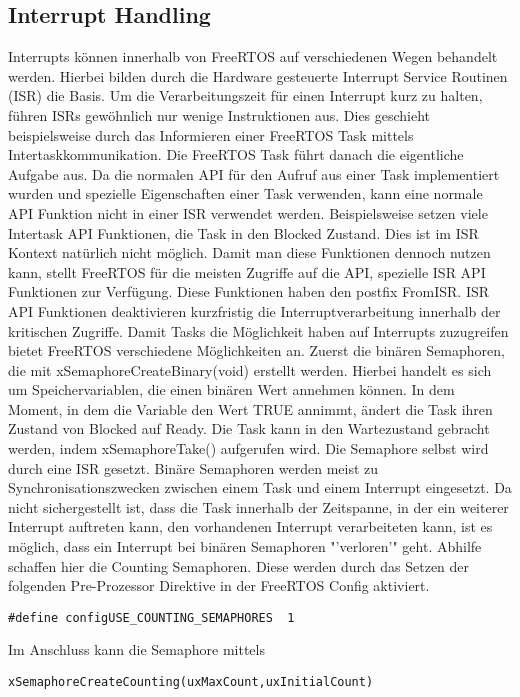 \subsection{Interrupt Handling}
\label{sec:Interrupt}
Interrupts können innerhalb von FreeRTOS auf verschiedenen Wegen behandelt werden. Hierbei bilden durch die Hardware gesteuerte Interrupt Service Routinen (ISR) die Basis. Um die Verarbeitungszeit für einen Interrupt kurz zu halten, führen ISRs gewöhnlich nur wenige Instruktionen aus. Dies geschieht beispielsweise durch das Informieren einer FreeRTOS Task mittels Intertaskkommunikation. Die FreeRTOS Task führt danach die eigentliche Aufgabe aus. Da die normalen API für den Aufruf aus einer Task implementiert wurden und spezielle Eigenschaften einer Task verwenden, kann eine normale API Funktion nicht in einer ISR verwendet werden. Beispielsweise setzen viele Intertask API Funktionen, die Task in den Blocked Zustand. Dies ist im ISR Kontext natürlich nicht möglich.
Damit man diese Funktionen dennoch nutzen kann, stellt FreeRTOS für die meisten Zugriffe auf die API, spezielle ISR API Funktionen zur Verfügung. Diese Funktionen haben den postfix FromISR. ISR API Funktionen deaktivieren kurzfristig die Interruptverarbeitung innerhalb der kritischen Zugriffe.
Damit Tasks die Mög\-lich\-keit haben auf Interrupts zuzugreifen bietet FreeRTOS verschiedene Mög\-lich\-keit\-en an. Zuerst die binären Semaphoren, die mit xSemaphoreCreateBinary(void) erstellt werden. Hierbei handelt es sich um Speichervariablen, die einen binären Wert annehmen können. In dem Moment, in dem die Variable den Wert TRUE annimmt, ändert die Task ihren Zustand von Blocked auf Ready. Die Task kann in den Wartezustand gebracht werden, indem xSemaphoreTake() aufgerufen wird. Die Semaphore selbst wird durch eine ISR gesetzt. Binäre Semaphoren werden meist zu Synchronisationszwecken zwischen einem Task und einem Interrupt eingesetzt.
Da nicht sichergestellt ist, dass die Task innerhalb der Zeitspanne, in der ein weiterer Interrupt auftreten kann, den vorhandenen Interrupt verarbeiteten kann, ist es möglich, dass ein Interrupt bei binären Semaphoren "'verloren'" geht. Abhilfe schaffen hier die Counting Semaphoren. Diese werden durch das Setzen der folgenden Pre-Prozessor Direktive in der FreeRTOS Config aktiviert.
\begin{lstlisting}[numbers = none]
#define configUSE_COUNTING_SEMAPHORES  1
\end{lstlisting}
Im Anschluss kann die Semaphore mittels
\begin{lstlisting}[numbers = none]
xSemaphoreCreateCounting(uxMaxCount,uxInitialCount) 
\end{lstlisting}
